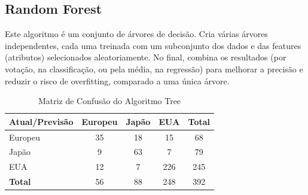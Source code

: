 \documentclass[conference]{IEEEtran}
\begin{document}
\subsection{Random Forest}
Este algoritmo é um conjunto de árvores de decisão. Cria várias árvores independentes, cada uma treinada com
um subconjunto dos dados e das features (atributos) selecionados aleatoriamente. No final, combina os resultados
(por votação, na classificação, ou pela média, na regressão) para melhorar a precisão e reduzir o risco de overfitting,
comparado a uma única árvore.
\begin{table}[!ht]
	\centering
	\begin{tabular}{lcccc}
		\toprule
		\textbf{Atual/Previsão} & \textbf{Europeu} & \textbf{Japão} & \textbf{EUA} & \textbf{Total} \\
		\midrule
		Europeu                 & 35               & 18             & 15           & 68             \\
		Japão                   & 9                & 63             & 7            & 79             \\
		EUA                     & 12               & 7              & 226          & 245            \\
		\midrule
		\textbf{Total}          & 56               & 88             & 248          & 392            \\
		\bottomrule
	\end{tabular}
	\label{tab:conf_matrix_forest}
	\caption{Matriz de Confusão do Algoritmo Tree}
\end{table}

\end{document}
